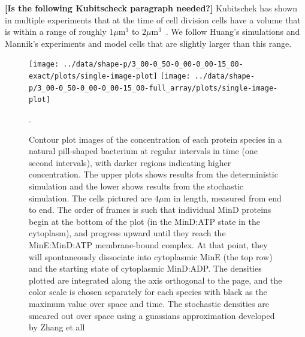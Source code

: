 \documentclass[letterpaper,twocolumn,amsmath,amssymb,pre]{revtex4-1}
\newcommand{\red}[1]{{\bf \color{red} #1}}
\newcommand{\fixme}[1]{\red{[#1]}}
\newcommand\micron{\ensuremath{\mu\text{m}}}
\begin{document}

\fixme{Is the following Kubitscheck paragraph needed?}
Kubitschek has shown in multiple experiments that at the time of cell
division cells have a volume that is within a range of roughly
$1\micron^3$ to $2\micron^3$~\cite{kubitschek1990cell,
  kubitschek1968linear}.  We follow Huang's
simulations\cite{huang2003dynamic} and Mannik's experiments and model
cells that are slightly larger than this range.

\begin{figure}
  \texttt{[image: ../data/shape-p/3\_00-0\_50-0\_00-0\_00-15\_00-exact/plots/single-image-plot]}
  \texttt{[image: ../data/shape-p/3\_00-0\_50-0\_00-0\_00-15\_00-full\_array/plots/single-image-plot]}
  \caption{Contour plot images of the concentration of each protein
    species in a natural pill-shaped bacterium at regular intervals in
    time (one second intervals), with darker regions indicating higher
    concentration. The upper plots shows results from the
    deterministic simulation and the lower shows results from the
    stochastic simulation.  The cells pictured are $4\micron$ in
    length, measured from end to end.  The order of frames is such
    that individual MinD proteins begin at the bottom of the plot (in
    the MinD:ATP state in the cytoplasm), and progress upward until
    they reach the MinE:MinD:ATP membrane-bound complex.  At that
    point, they will spontaneously dissociate into cytoplasmic MinE
    (the top row) and the starting state of cytoplasmic MinD:ADP.  The
    densities plotted are integrated along the axis orthogonal to the
    page, and the color scale is chosen separately for each species
    with black as the maximum value over space and time.  The
    stochastic densities are smeared out over space using a guassians
    approximation developed by Zhang et all~\cite{zhang2007gaussian}}.
  \label{image-p}
\end{figure}
\end{document}
